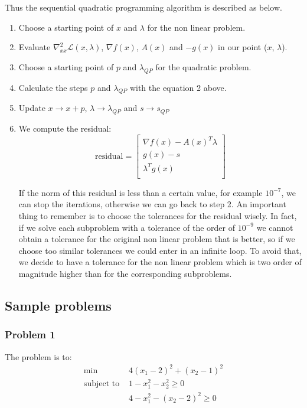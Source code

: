 \documentclass{article}
\begin{document}
Thus the sequential quadratic programming algorithm is described as below.
\begin{enumerate}
    \item Choose a starting point of $x$ and $\lambda$ for the non linear problem. 
    \item Evaluate $\nabla^2_{xx}\mathcal{L}(x, \lambda)$, $\nabla f(x)$, $A(x)$ and $-g(x)$ in our point ($x$, $\lambda$).
    \item Choose a starting point of $p$ and $\lambda_{QP}$ for the quadratic problem. 
    \item Calculate the steps $p$ and $\lambda_{QP}$ with the equation 2 above. 
    \item Update $x \rightarrow x + p$, $\lambda \rightarrow \lambda_{QP}$ and $s \rightarrow s_{QP}$
    \item We compute the residual:
    \begin{equation*}
\text{residual}=
\begin{bmatrix}
\nabla f(x)-A(x)^T \lambda  \\
g(x)-s \\
\lambda^T g(x)\\
\end{bmatrix} 
\end{equation*}

If the norm of this residual is less than a certain value, for example $10^{-7}$, we can stop the iterations, otherwise we can go back to step 2.
An important thing to remember is to choose the tolerances for the residual wisely. In fact, if we solve each subproblem with a tolerance of the order of $10^{-9}$ we cannot obtain a tolerance for the original non linear problem that is better, so if we choose too similar tolerances we could enter in an infinite loop. To avoid that, we decide to have a tolerance for the non linear problem which is two order of magnitude higher than for the corresponding subproblems.


\end{enumerate}


\subsection{Sample problems}
\subsubsection{Problem 1}
The problem is to:
\begin{equation*}
\begin{aligned}
\textrm{min } & 4(x_1-2)^2 + (x_2-1)^2 \\
\textrm{subject to } & 1 - x_1^2 - x_2^2 \geq 0 \\
                     & 4 - x_1^2 - (x_2-2)^2 \geq 0 \\
\end{aligned}
\end{equation*}
\end{document}
